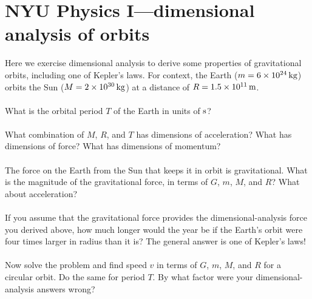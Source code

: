\documentclass[12pt]{article}
\begin{document}
\section*{NYU Physics I---dimensional analysis of orbits}

Here we exercise dimensional analysis to derive some properties of
gravitational orbits, including one of Kepler's laws.
For context, the Earth ($m= 6\times 10^{24}\,\mathrm{kg}$) orbits the Sun ($M= 2\times
10^{30}\,\mathrm{kg}$) at a distance of $R= 1.5\times 10^{11}\,\mathrm{m}$.

\paragraph{\theproblem}%
What is the orbital period $T$ of the Earth in units of $\mathrm{s}$?

\paragraph{\theproblem}%
What combination of $M$, $R$, and $T$ has dimensions of acceleration?
What has dimensions of force?  What has dimensions of momentum?

\paragraph{\theproblem}%
The force on the Earth from the Sun that keeps it in orbit is
gravitational.  What is the magnitude of the gravitational force, in
terms of $G$, $m$, $M$, and $R$? What about acceleration?

\paragraph{\theproblem}%
If you assume that the gravitational force provides the
dimensional-analysis force you derived above, how much longer would
the year be if the Earth's orbit were four times larger in radius than
it is?  The general answer is one of Kepler's laws!

\paragraph{\theproblem}%
Now solve the problem and find speed $v$ in terms of $G$, $m$, $M$,
and $R$ for a circular orbit. Do the same for period $T$. By what
factor were your dimensional-analysis answers wrong?
\end{document}
